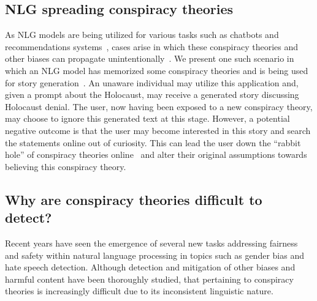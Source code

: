 \documentclass[11pt,a4paper]{article}
\begin{document}
\subsection{NLG spreading conspiracy theories}
As NLG models are being utilized for various tasks such as chatbots and recommendations systems~\cite{gatt2018survey}, cases arise in which these conspiracy theories and other biases can propagate unintentionally~\cite{bender2021dangers}. We present one such scenario in which an NLG model has memorized some conspiracy theories and is being used for story generation~\cite{fan-etal-2018-hierarchical}. An unaware individual may utilize this application and, given a prompt about the Holocaust, may receive a generated story discussing Holocaust denial. The user, now having been exposed to a new conspiracy theory, may choose to ignore this generated text at this stage. However, a potential negative outcome is that the user may become interested in this story and search the statements online out of curiosity. This can lead the user down the ``rabbit hole'' of conspiracy theories online~\cite{o2015down} and alter their original assumptions towards believing this conspiracy theory.  

\subsection{Why are conspiracy theories difficult to detect?}\label{sec:difficult}
Recent years have seen the emergence of several new tasks addressing fairness and safety within natural language processing in topics such as gender bias and hate speech detection. Although detection and mitigation of other biases and harmful content have been thoroughly studied, that pertaining to conspiracy theories is increasingly difficult due to its inconsistent linguistic nature. 
\end{document}

